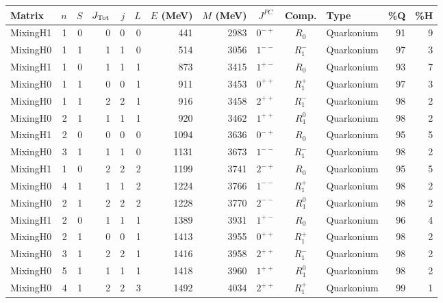 \documentclass[11pt, a4paper]{article}
\begin{document}
\begin{table}[p]
\centering
\scriptsize
\setlength{\tabcolsep}{4pt}
\begin{tabular}{l r r r r r r r c c l r r}
\toprule
Matrix & $n$ & $S$ & $J_{\rm Tot}$ & $j$ & $L$ & $E$ (MeV) & $M$ (MeV) & $J^{PC}$ & Comp. & Type & \%Q & \%H \\
\midrule
\rowcolor{cyan!12} MixingH1 & 1 & 0 & 0 & 0 & 0 & 441 & 2983 & $0^{-+}$ & $R_0$ & Quarkonium & 91 & 9 \\
\rowcolor{cyan!12} MixingH0 & 1 & 1 & 1 & 1 & 0 & 514 & 3056 & $1^{--}$ & $R_1^{-}$ & Quarkonium & 97 & 3 \\
\rowcolor{cyan!12} MixingH1 & 1 & 0 & 1 & 1 & 1 & 873 & 3415 & $1^{+-}$ & $R_0$ & Quarkonium & 93 & 7 \\
\rowcolor{cyan!12} MixingH0 & 1 & 1 & 0 & 0 & 1 & 911 & 3453 & $0^{++}$ & $R_1^{+}$ & Quarkonium & 97 & 3 \\
\rowcolor{cyan!12} MixingH0 & 1 & 1 & 2 & 2 & 1 & 916 & 3458 & $2^{++}$ & $R_1^{-}$ & Quarkonium & 98 & 2 \\
\rowcolor{cyan!12} MixingH0 & 2 & 1 & 1 & 1 & 1 & 920 & 3462 & $1^{++}$ & $R_1^{0}$ & Quarkonium & 98 & 2 \\
\rowcolor{cyan!12} MixingH1 & 2 & 0 & 0 & 0 & 0 & 1094 & 3636 & $0^{-+}$ & $R_0$ & Quarkonium & 95 & 5 \\
\rowcolor{cyan!12} MixingH0 & 3 & 1 & 1 & 1 & 0 & 1131 & 3673 & $1^{--}$ & $R_1^{-}$ & Quarkonium & 98 & 2 \\
\rowcolor{cyan!12} MixingH1 & 1 & 0 & 2 & 2 & 2 & 1199 & 3741 & $2^{-+}$ & $R_0$ & Quarkonium & 95 & 5 \\
\rowcolor{cyan!12} MixingH0 & 4 & 1 & 1 & 1 & 2 & 1224 & 3766 & $1^{--}$ & $R_1^{+}$ & Quarkonium & 98 & 2 \\
\rowcolor{cyan!12} MixingH0 & 2 & 1 & 2 & 2 & 2 & 1228 & 3770 & $2^{--}$ & $R_1^{0}$ & Quarkonium & 98 & 2 \\
\rowcolor{cyan!12} MixingH1 & 2 & 0 & 1 & 1 & 1 & 1389 & 3931 & $1^{+-}$ & $R_0$ & Quarkonium & 96 & 4 \\
\rowcolor{cyan!12} MixingH0 & 2 & 1 & 0 & 0 & 1 & 1413 & 3955 & $0^{++}$ & $R_1^{+}$ & Quarkonium & 98 & 2 \\
\rowcolor{cyan!12} MixingH0 & 3 & 1 & 2 & 2 & 1 & 1416 & 3958 & $2^{++}$ & $R_1^{-}$ & Quarkonium & 98 & 2 \\
\rowcolor{cyan!12} MixingH0 & 5 & 1 & 1 & 1 & 1 & 1418 & 3960 & $1^{++}$ & $R_1^{0}$ & Quarkonium & 98 & 2 \\
\rowcolor{cyan!12} MixingH0 & 4 & 1 & 2 & 2 & 3 & 1492 & 4034 & $2^{++}$ & $R_1^{+}$ & Quarkonium & 99 & 1 \\

\end{tabular}
\end{table}
\end{document}
